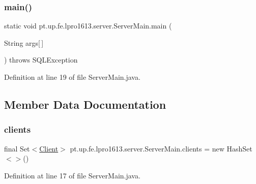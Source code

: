 \subsubsection{\texorpdfstring{main()}{main()}}
{\footnotesize\ttfamily static void pt.\+up.\+fe.\+lpro1613.\+server.\+Server\+Main.\+main (\begin{DoxyParamCaption}\item[{String}]{args\mbox{[}$\,$\mbox{]} }\end{DoxyParamCaption}) throws S\+Q\+L\+Exception\hspace{0.3cm}{\ttfamily [static]}}



Definition at line 19 of file Server\+Main.\+java.



\subsection{Member Data Documentation}
\hypertarget{classpt_1_1up_1_1fe_1_1lpro1613_1_1server_1_1_server_main_ad123167652dd573c163e4951b9eeada9}{}\label{classpt_1_1up_1_1fe_1_1lpro1613_1_1server_1_1_server_main_ad123167652dd573c163e4951b9eeada9} 
\subsubsection{\texorpdfstring{clients}{clients}}
{\footnotesize\ttfamily final Set$<$\hyperlink{classpt_1_1up_1_1fe_1_1lpro1613_1_1server_1_1conn_1_1_client}{Client}$>$ pt.\+up.\+fe.\+lpro1613.\+server.\+Server\+Main.\+clients = new Hash\+Set$<$$>$()\hspace{0.3cm}{\ttfamily [static]}}



Definition at line 17 of file Server\+Main.\+java.

\hypertarget{classpt_1_1up_1_1fe_1_1lpro1613_1_1server_1_1_server_main_af9f54f997c78d9974b788b66d05c4c2c}{}\label{classpt_1_1up_1_1fe_1_1lpro1613_1_1server_1_1_server_main_af9f54f997c78d9974b788b66d05c4c2c} 
